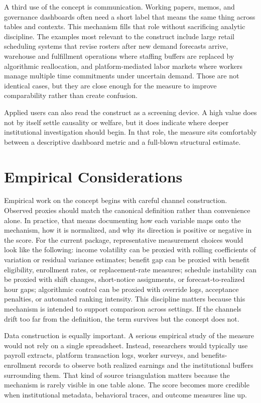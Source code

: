 \documentclass[12pt]{article}
\begin{document}
A third use of the concept is communication. Working papers, memos, and governance dashboards often need a short label that means the same thing across tables and contexts. This mechanism fills that role without sacrificing analytic discipline. The examples most relevant to the construct include large retail scheduling systems that revise rosters after new demand forecasts arrive, warehouse and fulfillment operations where staffing buffers are replaced by algorithmic reallocation, and platform-mediated labor markets where workers manage multiple time commitments under uncertain demand. Those are not identical cases, but they are close enough for the measure to improve comparability rather than create confusion.

Applied users can also read the construct as a screening device. A high value does not by itself settle causality or welfare, but it does indicate where deeper institutional investigation should begin. In that role, the measure sits comfortably between a descriptive dashboard metric and a full-blown structural estimate.

\section{Empirical Considerations}
Empirical work on the concept begins with careful channel construction. Observed proxies should match the canonical definition rather than convenience alone. In practice, that means documenting how each variable maps onto the mechanism, how it is normalized, and why its direction is positive or negative in the score. For the current package, representative measurement choices would look like the following: income volatility can be proxied with rolling coefficients of variation or residual variance estimates; benefit gap can be proxied with benefit eligibility, enrollment rates, or replacement-rate measures; schedule instability can be proxied with shift changes, short-notice assignments, or forecast-to-realized hour gaps; algorithmic control can be proxied with override logs, acceptance penalties, or automated ranking intensity. This discipline matters because this mechanism is intended to support comparison across settings. If the channels drift too far from the definition, the term survives but the concept does not.

Data construction is equally important. A serious empirical study of the measure would not rely on a single spreadsheet. Instead, researchers would typically use payroll extracts, platform transaction logs, worker surveys, and benefits-enrollment records to observe both realized earnings and the institutional buffers surrounding them. That kind of source triangulation matters because the mechanism is rarely visible in one table alone. The score becomes more credible when institutional metadata, behavioral traces, and outcome measures line up.
\end{document}
